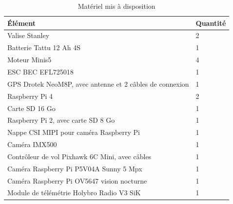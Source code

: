 \begin{table}[H]
\centering
\small
\caption{Matériel mis à disposition}
\label{tab:materiel}
\begin{tabularx}{\textwidth}{@{}Lp{2cm}@{}}
\toprule
\textbf{Élément} & \textbf{Quantité} \\
\midrule
Valise Stanley & 2 \\
Batterie Tattu 12 Ah 4S & 1 \\
Moteur Minis5 & 4 \\
ESC BEC EFL725018 & 1 \\
GPS Drotek NeoM8P, avec antenne et 2 câbles de connexion & 1 \\
Raspberry Pi 4 & 2 \\
Carte SD 16 Go & 1 \\
Raspberry Pi 2, avec carte SD 8 Go & 1 \\
Nappe CSI MIPI pour caméra Raspberry Pi & 1 \\
Caméra IMX500 & 1 \\
Contrôleur de vol Pixhawk 6C Mini, avec câbles & 1 \\
Caméra Raspberry Pi P5V04A Sunny 5 Mpx & 1 \\
Caméra Raspberry Pi OV5647 vision nocturne & 1 \\
Module de télémétrie Holybro Radio V3 SiK & 1 \\
\bottomrule
\end{tabularx}
\end{table}

